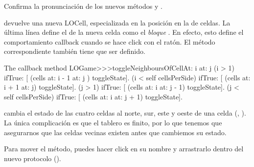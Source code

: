 \documentclass[a4paper,10pt,twoside]{book}
\begin{document}
{%
Confirma la pronunciaci\'on de los nuevos m\'etodos  y .

 devuelve una nueva LOCell, especializada en la posici\'on  en la  de celdas.
La \'ultima l\'inea define el  de la nueva celda como el \emph{bloque}
\mbox{.}
En efecto, esto define el comportamiento callback cuando se hace click con el rat\'on. 
El m\'etodo correspondiente tambi\'en tiene que ser definido. 

\begin{method}[toggleNeighboursOfCellAt:at:]{The callback method}
LOGame>>>toggleNeighboursOfCellAt: i at: j
   (i > 1) ifTrue: [ (cells at: i - 1 at: j ) toggleState].
   (i < self cellsPerSide) ifTrue: [ (cells at: i + 1 at: j) toggleState].
   (j > 1) ifTrue: [ (cells at: i  at: j - 1) toggleState].
   (j < self cellsPerSide) ifTrue: [ (cells at: i at: j + 1) toggleState].
\end{method}

 cambia el estado de las cuatro celdas al norte, sur, este y oeste de una celda (, ). La \'unica complicaci\'on es que el tablero es finito, por lo que tenemos que asegurarnos que las celdas vecinas existen antes que cambiemos su estado. 

Para mover el m\'etodo, puedes hacer click en su nombre y arrastrarlo dentro del nuevo protocolo ().

}
\end{document}
